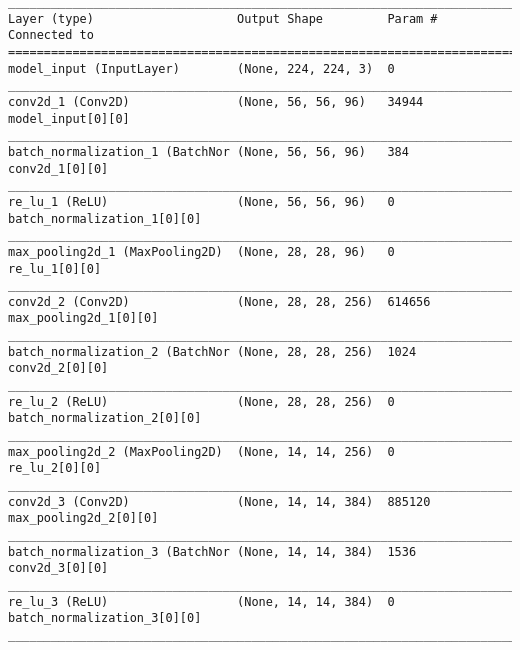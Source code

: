 \begin{lstlisting}[caption={AlexNet-VAE Encoder},captionpos=b,basicstyle=\tiny, label={lst:alexnet-vae-encoder}]
__________________________________________________________________________________________________
Layer (type)                    Output Shape         Param #     Connected to
==================================================================================================
model_input (InputLayer)        (None, 224, 224, 3)  0
__________________________________________________________________________________________________
conv2d_1 (Conv2D)               (None, 56, 56, 96)   34944       model_input[0][0]
__________________________________________________________________________________________________
batch_normalization_1 (BatchNor (None, 56, 56, 96)   384         conv2d_1[0][0]
__________________________________________________________________________________________________
re_lu_1 (ReLU)                  (None, 56, 56, 96)   0           batch_normalization_1[0][0]
__________________________________________________________________________________________________
max_pooling2d_1 (MaxPooling2D)  (None, 28, 28, 96)   0           re_lu_1[0][0]
__________________________________________________________________________________________________
conv2d_2 (Conv2D)               (None, 28, 28, 256)  614656      max_pooling2d_1[0][0]
__________________________________________________________________________________________________
batch_normalization_2 (BatchNor (None, 28, 28, 256)  1024        conv2d_2[0][0]
__________________________________________________________________________________________________
re_lu_2 (ReLU)                  (None, 28, 28, 256)  0           batch_normalization_2[0][0]
__________________________________________________________________________________________________
max_pooling2d_2 (MaxPooling2D)  (None, 14, 14, 256)  0           re_lu_2[0][0]
__________________________________________________________________________________________________
conv2d_3 (Conv2D)               (None, 14, 14, 384)  885120      max_pooling2d_2[0][0]
__________________________________________________________________________________________________
batch_normalization_3 (BatchNor (None, 14, 14, 384)  1536        conv2d_3[0][0]
__________________________________________________________________________________________________
re_lu_3 (ReLU)                  (None, 14, 14, 384)  0           batch_normalization_3[0][0]
__________________________________________________________________________________________________

\end{lstlisting}
